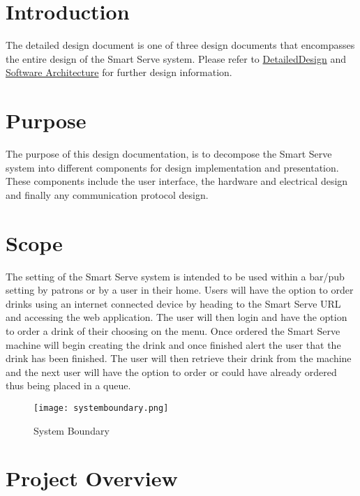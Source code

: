 \documentclass[12pt, titlepage]{article}
\begin{document}
\newpage

\tableofcontents

\newpage

\listoftables

\listoffigures

\newpage


\section{Introduction}
The detailed design document is one of three design documents that encompasses the entire design of the Smart Serve system. Please refer to \href{https://github.com/purefisher/Smart-Serve/blob/main/docs/Design/DetailedDesign.pdf}{DetailedDesign} and \href{https://github.com/purefisher/Smart-Serve/blob/main/docs/Design/DetailedDesi.pdf}{Software Architecture} for further design information.
\section{Purpose}
The purpose of this design documentation, is to decompose the Smart Serve system into different components for design implementation and presentation. These components include the user interface, the hardware and electrical design and finally any communication protocol design. 

\section{Scope}
The setting of the Smart Serve system is intended to be used within a bar/pub setting by patrons or by a user in their home. Users will have the option to order drinks using an internet connected device by heading to the Smart Serve URL and accessing the web application. The user will then login and have the option to order a drink of their choosing on the menu. Once ordered the Smart Serve machine will begin creating the drink and once finished alert the user that the drink has been finished. The user will then retrieve their drink from the machine and the next user will have the option to order or could have already ordered thus being placed in a queue. 
\begin{figure}[H]
    \centerline{\texttt{[image: systemboundary.png]}}
    \caption{System Boundary}
    \label{fig}
\end{figure}

\section{Project Overview}
\end{document}
